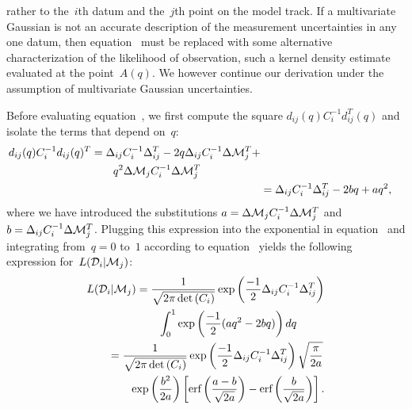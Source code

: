 rather to the~$i$th datum and the~$j$th point on the model track.
If a multivariate Gaussian is not an accurate description of the measurement
uncertainties in any one datum, then equation~ must
be replaced with some alternative characterization of the likelihood of
observation, such a kernel density estimate evaluated at the point~$A(q)$.
We however continue our derivation under the assumption of multivariate
Gaussian uncertainties.
\par
Before evaluating equation~, we first compute the square
$d_{ij}(q)C_i^{-1}d_{ij}^T(q)$ and isolate the terms that depend on~$q$:
\begin{subequations}\begin{align}
\begin{split}
d_{ij}(q) C_i^{-1} d_{ij}(q)^T &= \Delta_{ij} C_i^{-1} \Delta_{ij}^T -
2q\Delta_{ij}C_i^{-1}\Delta \mathcal{M}_j^T +
\\
&\qquad q^2\Delta \mathcal{M}_j C_i^{-1} \Delta \mathcal{M}_j^T
\end{split}
\label{dga:eq:chisquared}
\\
&= \Delta_{ij} C_i^{-1} \Delta_{ij}^T - 2bq + aq^2,
\end{align}\end{subequations}
where we have introduced the substitutions
$a = \Delta\mathcal{M}_j C_i^{-1} \Delta\mathcal{M}_j^T$ and
$b = \Delta_{ij} C_i^{-1} \Delta\mathcal{M}_j^T$.
Plugging this expression into the exponential in equation~
and integrating from~$q = 0$ to~$1$ according to equation~
yields the following expression for~$L(\mathcal{D}_i | \mathcal{M}_j)$:
\begin{subequations}\begin{align}
\begin{split}
L(\mathcal{D}_i | \mathcal{M}_j) &= \frac{1}{\sqrt{2\pi \det{(C_i)}}}
\exp\left(\frac{-1}{2}\Delta_{ij} C_i^{-1} \Delta_{ij}^T\right)
\\
&\qquad \int_0^1 \exp\left(\frac{-1}{2}(aq^2 - 2bq)\right)dq
\end{split}
\\
\begin{split}
&= \frac{1}{\sqrt{2\pi\det{(C_i)}}}
\exp\left(\frac{-1}{2}\Delta_{ij}C_i^{-1}\Delta_{ij}^T\right)
\sqrt{\frac{\pi}{2a}}
\\
&\qquad \exp\left(\frac{b^2}{2a}\right)
\left[\text{erf}\left(\frac{a - b}{\sqrt{2a}}\right) - \text{erf}\left(\frac{b}{\sqrt{2a}}
\right)\right].
\end{split}
\end{align}\end{subequations}
